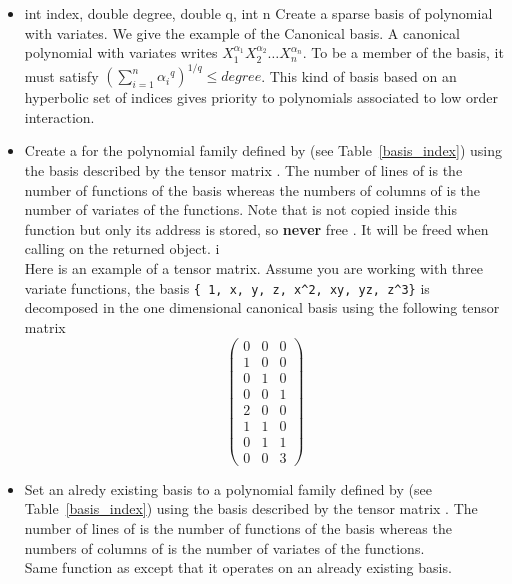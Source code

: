 \begin{itemize}
  \item  {}
    {int index, double degree, double q, int n}
    \sshortdescribe Create a sparse basis of polynomial with 
    variates. We give the example of the Canonical basis. A canonical polynomial
    with  variates writes $X_1^{\alpha_1} X_2^{\alpha_2} \dots
    X_n^{\alpha_n}$. To be a member of the basis, it must satisfy $\left(\sum_{i=1}^n {\alpha_i}^q \right)^{1/q} \leq degree$. This kind of basis based on an hyperbolic set of indices gives priority to polynomials associated to low
    order interaction.

  \item {}
    \sshortdescribe Create a \PnlBasis for the polynomial family
    defined by  (see Table~\ref{basis_index}) using the basis
    described by the tensor matrix . The number of lines of  is
    the number of functions of the basis whereas the numbers of columns of
     is the number of variates of the functions.
    Note that  is not copied inside this function but only its address is
    stored, so {\bf never} free . It will be freed when calling
     on the returned object. i\\
    Here is an example of a tensor matrix. Assume you are working with three
    variate functions, the basis \verb!{ 1, x, y, z, x^2, xy, yz, z^3}! is
    decomposed in the one dimensional canonical basis using the following tensor
    matrix
    \[ \left(
      \begin{array}{ccc}
        0 & 0 & 0 \\
        1 & 0 & 0 \\
        0 & 1 & 0 \\
        0 & 0 & 1 \\
        2 & 0 & 0 \\
        1 & 1 & 0 \\
        0 & 1 & 1\\
        0 & 0 & 3
      \end{array}
    \right) \]

  \item {}
    \sshortdescribe Set an alredy existing basis  to a polynomial family
    defined by  (see Table~\ref{basis_index}) using the basis
    described by the tensor matrix . The number of lines of  is
    the number of functions of the basis whereas the numbers of columns of
     is the number of variates of the functions. \\
    Same function as  except that it
    operates on an already existing basis.

\end{itemize}


